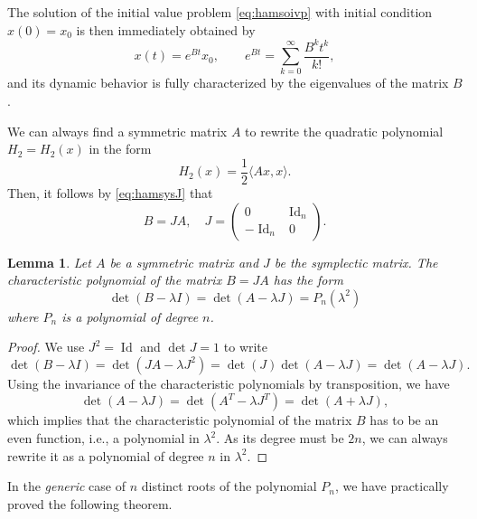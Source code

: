 \documentclass[english,fontsize=11pt,paper=a5,oneside]{scrbook}
\newcommand{\lag}{\langle}
\newcommand{\rag}{\rangle}
\DeclareMathOperator{\Id}{Id}
\newtheorem{lemma}[theorem]{Lemma}
\theoremstyle{definition}
\begin{document}
The solution of the initial value problem \eqref{eq:hamsoivp} with initial condition $x(0) = x_0$ is then immediately obtained by
\begin{equation}
  x(t) = e^{Bt} x_0, \qquad e^{Bt} = \sum_{k=0}^\infty \frac{B^k t^k}{k!},
\end{equation}
and its dynamic behavior is fully characterized by the eigenvalues of the matrix $B$.

We can always find a symmetric matrix $A$ to rewrite the quadratic polynomial $H_2 = H_2(x)$ in the form
\begin{equation}
  H_2(x) = \frac12 \lag Ax, x\rag.
\end{equation}
Then, it follows by \eqref{eq:hamsysJ} that
\begin{equation}
  B = J A, \quad J = \begin{pmatrix}
    0 & \Id_n \\-\Id_n&0
  \end{pmatrix}.
\end{equation}

\begin{lemma}\label{eq:lemmaCP}
  Let $A$ be a symmetric matrix and $J$ be the symplectic matrix.
  The characteristic polynomial of the matrix $B=JA$ has the form
  \begin{equation}
    \det(B-\lambda I) = \det(A-\lambda J) = P_n(\lambda^2)
  \end{equation}
  where $P_n$ is a polynomial of degree $n$.
\end{lemma}
\begin{proof}
  We use $J^2 = \Id$ and $\det J= 1$ to write
  \begin{equation}
    \det(B-\lambda I) = \det(JA - \lambda J^2) = \det(J) \det(A-\lambda J) = \det(A-\lambda J).
  \end{equation}
  Using the invariance of the characteristic polynomials by transposition, we have
  \begin{equation}
    \det(A-\lambda J) = \det(A^T -\lambda J^T) = \det(A + \lambda J),
  \end{equation}
  which implies that the characteristic polynomial of the matrix $B$ has to be an even function, i.e., a polynomial in $\lambda^2$.
  As its degree must be $2n$, we can always rewrite it as a polynomial of degree $n$ in $\lambda^2$.
\end{proof}

In the \emph{generic} case of $n$ distinct roots of the polynomial $P_n$, we have practically proved the following theorem.
\end{document}
